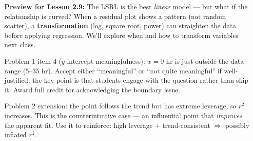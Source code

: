 \documentclass[10pt]{article}
\begin{document}
\vspace{0.16in}

\begin{tcolorbox}[colback=greenbg, colframe=greenacc, boxrule=0.8pt, arc=2mm,
    left=4mm, right=4mm, top=2.5mm, bottom=2.5mm]
\small\textbf{Preview for Lesson 2.9:} The LSRL is the best \emph{linear} model --- but what
if the relationship is curved? When a residual plot shows a pattern (not random scatter), a
\textbf{transformation} (log, square root, power) can straighten the data before applying
regression. We'll explore when and how to transform variables next class.
\end{tcolorbox}

\begin{teachernote}
Problem 1 item 4 ($y$-intercept meaningfulness): $x = 0$ hr is just outside the data range
(5--35 hr). Accept either ``meaningful'' or ``not quite meaningful'' if well-justified;
the key point is that students engage with the question rather than skip it. Award full credit
for acknowledging the boundary issue.

Problem 2 extension: the point follows the trend but has extreme leverage, so $r^2$ increases.
This is the counterintuitive case --- an influential point that \emph{improves} the apparent fit.
Use it to reinforce: high leverage + trend-consistent $\Rightarrow$ possibly inflated $r^2$.
\end{teachernote}
\end{document}
